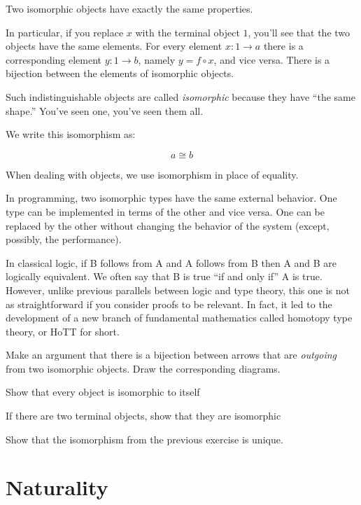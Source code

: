 \documentclass[DaoFP]{subfiles}
\begin{document}
Two isomorphic objects have exactly the same properties.

In particular, if you replace $x$ with the terminal object $1$, you'll see that the two objects have the same elements. For every element $x \colon 1 \to a$ there is a corresponding element $y \colon 1 \to b$, namely $y = f \circ x$, and vice versa. There is a bijection between the elements of isomorphic objects.

Such indistinguishable objects are called \emph{isomorphic} because they have ``the same shape.'' You've seen one, you've seen them all. 

We write this isomorphism as:

\[a \cong b\]

When dealing with objects, we use isomorphism in place of equality.

In programming, two isomorphic types have the same external behavior. One type can be implemented in terms of the other and vice versa. One can be replaced by the other without changing the behavior of the system (except, possibly, the performance). 

In classical logic, if B follows from A and A follows from B then A and B are logically equivalent. We often say that B is true ``if and only if'' A is true. However, unlike previous parallels between logic and type theory, this one is not as straightforward if you consider proofs to be relevant. In fact, it led to the development of a new branch of fundamental mathematics called homotopy type theory, or HoTT for short.

\begin{exercise}
Make an argument that there is a bijection between arrows that are \emph{outgoing} from two isomorphic objects. Draw the corresponding diagrams.
\end{exercise}


\begin{exercise}
Show that every object is isomorphic to itself
\end{exercise}

\begin{exercise}
If there are two terminal objects, show that they are isomorphic
\end{exercise}

\begin{exercise}
Show that the isomorphism from the previous exercise is unique.
\end{exercise}

\section{Naturality}
\end{document}
